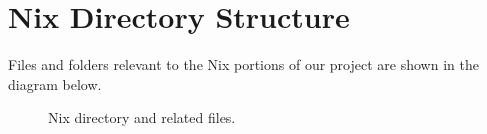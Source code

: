 
%    

\section{Nix Directory Structure}
\justify{}
Files and folders relevant to the Nix portions of our project are shown in the diagram below.

\begin{figure}[!htb]
	\centering
	
	\caption{Nix directory and related files.}
	\label{nixfiles}
\end{figure}
